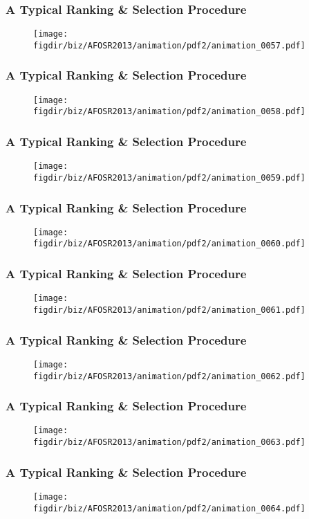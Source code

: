 \documentclass[13pt]{beamer}
\newcommand{\figdir}{../../fig}
\begin{document}
\begin{frame}\frametitle{A Typical Ranking \& Selection Procedure}\begin{figure}\texttt{[image: \\figdir/biz/AFOSR2013/animation/pdf2/animation\_0057.pdf]}\end{figure}\end{frame}
\begin{frame}\frametitle{A Typical Ranking \& Selection Procedure}\begin{figure}\texttt{[image: \\figdir/biz/AFOSR2013/animation/pdf2/animation\_0058.pdf]}\end{figure}\end{frame}
\begin{frame}\frametitle{A Typical Ranking \& Selection Procedure}\begin{figure}\texttt{[image: \\figdir/biz/AFOSR2013/animation/pdf2/animation\_0059.pdf]}\end{figure}\end{frame}
\begin{frame}\frametitle{A Typical Ranking \& Selection Procedure}\begin{figure}\texttt{[image: \\figdir/biz/AFOSR2013/animation/pdf2/animation\_0060.pdf]}\end{figure}\end{frame}
\begin{frame}\frametitle{A Typical Ranking \& Selection Procedure}\begin{figure}\texttt{[image: \\figdir/biz/AFOSR2013/animation/pdf2/animation\_0061.pdf]}\end{figure}\end{frame}
\begin{frame}\frametitle{A Typical Ranking \& Selection Procedure}\begin{figure}\texttt{[image: \\figdir/biz/AFOSR2013/animation/pdf2/animation\_0062.pdf]}\end{figure}\end{frame}
\begin{frame}\frametitle{A Typical Ranking \& Selection Procedure}\begin{figure}\texttt{[image: \\figdir/biz/AFOSR2013/animation/pdf2/animation\_0063.pdf]}\end{figure}\end{frame}
\begin{frame}\frametitle{A Typical Ranking \& Selection Procedure}\begin{figure}\texttt{[image: \\figdir/biz/AFOSR2013/animation/pdf2/animation\_0064.pdf]}\end{figure}\end{frame}
\end{document}
